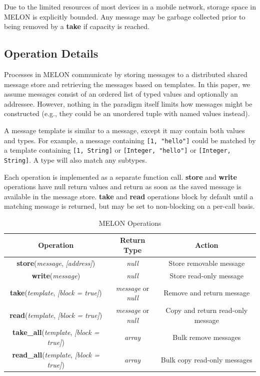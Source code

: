 \documentclass{llncs}
\begin{document}
Due to the limited resources of most devices in a mobile network, storage space in MELON is explicitly bounded. Any message may be garbage collected prior to being removed by a \textbf{take} if capacity is reached.

\subsection{Operation Details}

Processes in MELON communicate by storing messages to a distributed shared message store and retrieving the messages based on templates. In this paper, we assume messages consist of an ordered list of typed values and optionally an addressee. However, nothing in the paradigm itself limits how messages might be constructed (e.g., they could be an unordered tuple with named values instead).

A message template is similar to a message, except it may contain both values and types. For example, a message containing \texttt{[1, "hello"]} could be matched by a template containing \texttt{[1, String]} or \texttt{[Integer, "hello"]} or \texttt{[Integer, String]}. A type will also match any subtypes.

Each operation is implemented as a separate function call. \textbf{store} and \textbf{write} operations have null return values and return as soon as the saved message is available in the message store. \textbf{take} and \textbf{read} operations block by default until a matching message is returned, but may be set to non-blocking on a per-call basis.

\begin{table}
\centering
\begin{tabular}{|c|c|c|}
\hline
\textbf{Operation} & \textbf{Return Type} & \textbf{Action} \\ \hline
\textbf{store}(\textit{message}, \textit{[address]}) & \textit{null} & Store removable message \\ \hline
\textbf{write}(\textit{message}) & \textit{null} & Store read-only message \\ \hline
\textbf{take}(\textit{template}, \textit{[block = true]}) & \textit{message} or \textit{null} & Remove and return message \\ \hline
\textbf{read}(\textit{template}, \textit{[block = true]}) & \textit{message} or \textit{null} & Copy and return read-only message \\ \hline
\textbf{take\_all}(\textit{template}, \textit{[block = true]}) & \textit{array} & Bulk remove messages \\ \hline
\textbf{read\_all}(\textit{template}, \textit{[block = true]}) & \textit{array} & Bulk copy read-only messages \\ \hline
\end{tabular}
\caption{MELON Operations}
\end{table}
\end{document}
